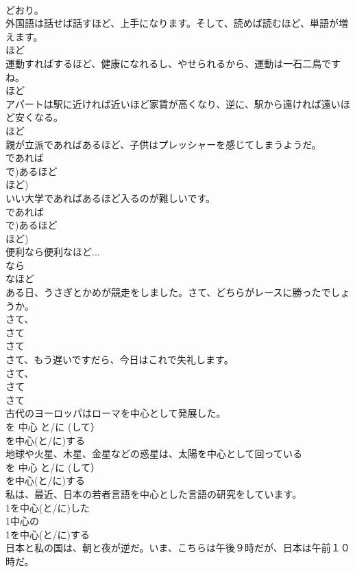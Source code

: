 \documentclass[8pt]{extreport}
\begin{document}
\begin{CJK}{UTF8}{min}
{\\	どおり。
\\	外国語は話せば話すほど、上手になります。そして、読めば読むほど、単語が増えます。	
\\	ほど 
\\	運動すればするほど、健康になれるし、やせられるから、運動は一石二鳥ですね。	
\\	ほど 
\\	アパートは駅に近ければ近いほど家賃が高くなり、逆に、駅から遠ければ遠いほど安くなる。	
\\	ほど 
\\	親が立派であればあるほど、子供はプレッシャーを感じてしまうようだ。	
\\	であれば 
\\	で)あるほど 
\\	ほど)
\\	いい大学であればあるほど入るのが難しいです。	
\\	であれば 
\\	で)あるほど 
\\	ほど)
\\	便利なら便利なほど...	
\\	なら
\\	なほど 
\\	ある日、うさぎとかめが競走をしました。さて、どちらがレースに勝ったでしょうか。	
\\	さて、
\\	さて 
\\	さて
\\	さて、もう遅いですだら、今日はこれで失礼します。	
\\	さて、
\\	さて 
\\	さて
\\	古代のヨーロッパはローマを中心として発展した。	
\\	を 中心 {と/に} (して） 
\\	を中心(と/に)する 
\\	地球や火星、木星、金星などの惑星は、太陽を中心として回っている	
\\	を 中心 {と/に} (して） 
\\	を中心(と/に)する 
\\	私は、最近、日本の若者言語を中心とした言語の研究をしています。	
\\	1を中心(と/に)した 
\\	1中心の
\\	1を中心(と/に)する 
\\	日本と私の国は、朝と夜が逆だ。いま、こちらは午後９時だが、日本は午前１０時だ。	
}
\end{CJK}
\end{document}
